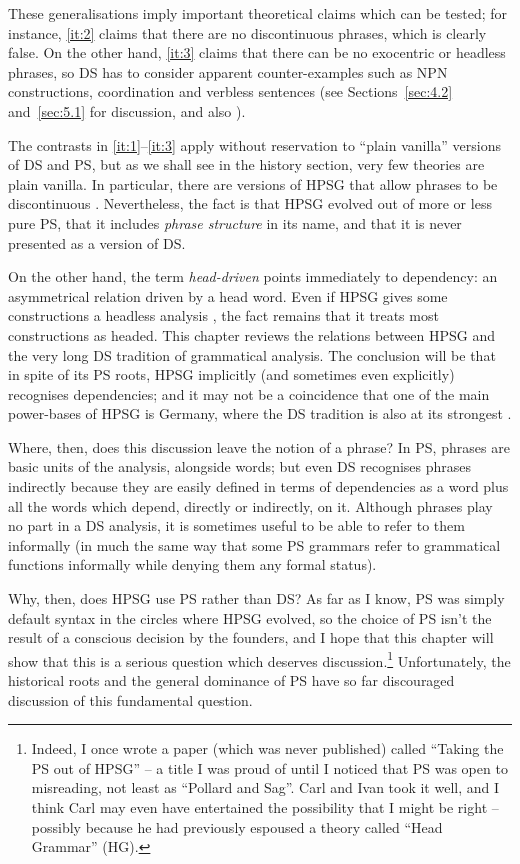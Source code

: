 \documentclass[output=paper
 	        ,biblatex
                ,babelshorthands
                ,newtxmath
                ,draftmode
                ,colorlinks, citecolor=brown
]{langscibook}
\begin{document}
These generalisations imply important theoretical claims which can be tested; for instance, \ref{it:2} claims that there are no discontinuous phrases, which is clearly false. On the other hand, \ref{it:3} claims that there can be no exocentric or headless phrases, so DS has to consider apparent counter-examples such as NPN constructions, coordination and verbless sentences (see Sections~\ref{sec:4.2} and~\ref{sec:5.1} for discussion, and also ).

The contrasts in \ref{it:1}--\ref{it:3} apply without reservation to ``plain vanilla'' \citep{Zwicky1985} versions of DS and PS, but as we shall see in the history section, very few theories are plain vanilla. In particular, there are versions of HPSG that allow phrases to be discontinuous \citep{Reape94a,Kathol2000a,Mueller95c,Babel}. Nevertheless, the fact is that HPSG evolved out of more or less pure PS, that it includes \emph{phrase structure} in its name, and that it is never presented as a version of DS.

On the other hand, the term \emph{head-driven} points immediately to dependency: an asymmetrical relation driven by a head word. Even if HPSG gives some constructions a headless analysis \citep[654--666]{MuellerGT-Eng2}, the fact remains that it treats most constructions as headed.
This chapter reviews the relations between HPSG and the very long DS tradition of grammatical analysis. The conclusion will be that in spite of its PS roots, HPSG implicitly (and sometimes even explicitly) recognises dependencies; and it may not be a coincidence that one of the main power-bases of HPSG is Germany, where the DS tradition is also at its strongest  \citep[359]{MuellerGT-Eng2}.

Where, then, does this discussion leave the notion of a phrase? In PS, phrases are basic units of the analysis, alongside words; but even DS recognises phrases indirectly because they are easily defined in terms of dependencies as a word plus all the words which depend, directly or indirectly, on it. Although phrases play no part in a DS analysis, it is sometimes useful to be able to refer to them informally (in much the same way that some PS grammars refer to grammatical functions informally while denying them any formal status).

Why, then, does HPSG use PS rather than DS? As far as I know, PS was simply default syntax in the circles where HPSG evolved, so the choice of PS isn’t the result of a conscious decision by the founders, and I hope that this chapter will show that this is a serious question which deserves discussion.\footnote{%
  Indeed, I once wrote a paper (which was never published) called ``Taking the PS out of HPSG'' – a
  title I was proud of until I noticed that PS was open to misreading, not least as ``Pollard and
  Sag''. Carl and Ivan took it well, and I think Carl may even have entertained the possibility that
  I might be right – possibly because he had previously espoused a theory called ``Head Grammar''
  (HG).%
}
Unfortunately, the historical roots and the general dominance of PS have so far discouraged discussion of this fundamental question.
\end{document}
